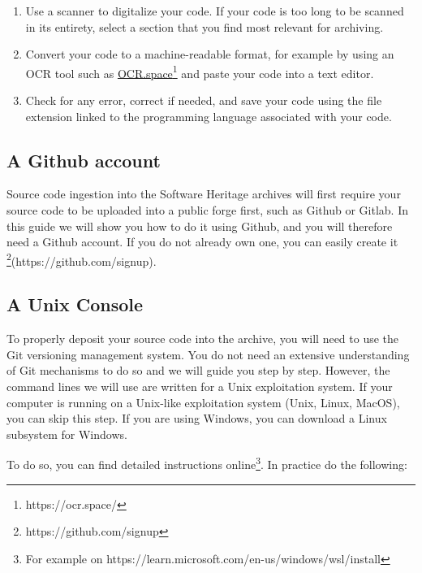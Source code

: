 \documentclass[]{article}
\providecommand{\tightlist}{%
  \setlength{\itemsep}{0pt}\setlength{\parskip}{0pt}}
\begin{document}
\begin{enumerate}
\def\labelenumi{\arabic{enumi})}
\tightlist
\item
  Use a scanner to digitalize your code. If your code is too long to be
  scanned in its entirety, select a section that you find most relevant
  for archiving.
\item
  Convert your code to a machine-readable format, for example by using
  an OCR tool such as \href{https://ocr.space/}{OCR.space}\footnote{https://ocr.space/}
  and paste your code into a text editor.
\item
  Check for any error, correct if needed, and save your code using the
  file extension linked to the programming language associated with your
  code.
\end{enumerate}

\hypertarget{a-github-account}{%
\subsection{A Github account}\label{a-github-account}}

Source code ingestion into the Software Heritage archives will first
require your source code to be uploaded into a public forge first, such
as Github or Gitlab. In this guide we will show you how to do it using
Github, and you will therefore need a Github account. If you do not
already own one, you can easily create it
\footnote{https://github.com/signup}(https://github.com/signup).

\hypertarget{a-unix-console}{%
\subsection{A Unix Console}\label{a-unix-console}}

To properly deposit your source code into the archive, you will need to
use the Git versioning management system. You do not need an extensive
understanding of Git mechanisms to do so and we will guide you step by
step. However, the command lines we will use are written for a Unix
exploitation system. If your computer is running on a Unix-like
exploitation system (Unix, Linux, MacOS), you can skip this step. If you
are using Windows, you can download a Linux subsystem for Windows.

To do so, you can find detailed instructions online\footnote{For example
  on https://learn.microsoft.com/en-us/windows/wsl/install}. In practice
do the following:
\end{document}
